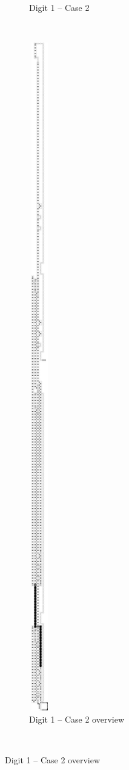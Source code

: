 \begin{itemize}
\begin{figure}[H]
\begin{subfigure}[t]{0.33\textwidth}
                \caption{\label{fig:pre_warp_1_op_msr} Digit 1 -- Case 2}
            \end{subfigure}%
            ~
            \begin{subfigure}[t]{0.2\textwidth}
                \centering
                \includegraphics[width=0.1\textwidth]{overviews/case2/pre_warp_1_op_msr}
                \caption{\label{fig:pre_warp_1_op_msr_overview} Digit 1 -- Case 2 overview}
            \end{subfigure}%
            ~
        \end{figure}


\end{itemize}
